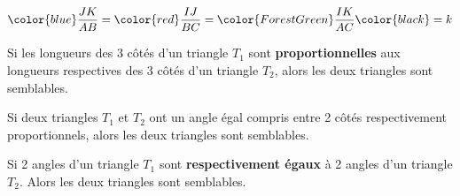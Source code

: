 \documentclass[main.tex]{subfiles}
\begin{document}
\[ 	{\color{blue} \frac{JK}{AB} } = {\color{red} \frac{IJ}{BC} } = {\color{ForestGreen} \frac{IK}{AC} } \color{black} =k \]
\begin{postulat} Si les longueurs des 3 côtés d'un triangle $T_1$ sont \textbf{proportionnelles} aux longueurs respectives des 3 côtés d'un triangle $T_2$, alors les deux triangles sont semblables.
\end{postulat}

\begin{postulat} Si deux triangles $T_1$ et $T_2$ ont un angle égal compris entre 2 côtés respectivement proportionnels, alors les deux triangles sont semblables.  
\end{postulat} 
 
\begin{postulat} Si 2 angles d'un triangle $T_1$ sont \textbf{respectivement égaux} à 2 angles d'un triangle $T_2$. Alors les deux triangles sont semblables.  
\end{postulat} 


\newpage 
{}  
\pagestyle{scrheadings} %
\onehalfspacing
\end{document}
